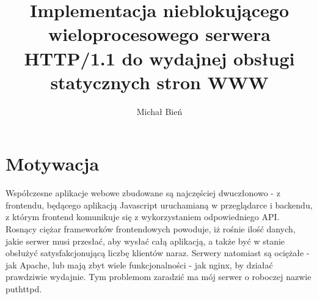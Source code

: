 \documentclass[a4paper]{article}
\author{Michał Bień}
\title{Implementacja nieblokującego wieloprocesowego serwera HTTP/1.1 do wydajnej obsługi statycznych stron WWW}
\date{}
\begin{document}
\maketitle
\section{Motywacja}
Współczesne aplikacje webowe zbudowane są najczęściej dwuczłonowo - z frontendu, będącego aplikacją Javascript uruchamianą w przeglądarce i backendu, z którym frontend komunikuje się z wykorzystaniem odpowiedniego API. Rosnący ciężar frameworków frontendowych powoduje, iż rośnie ilość danych, jakie serwer musi przesłać, aby wysłać całą aplikacją, a także być w stanie obsłużyć satysfakcjonującą liczbę klientów naraz. Serwery natomiast są ociężałe - jak Apache, lub mają zbyt wiele funkcjonalności - jak nginx, by działać prawdziwie wydajnie. Tym problemom zaradzić ma mój serwer o roboczej nazwie puthttpd.
\end{document}
